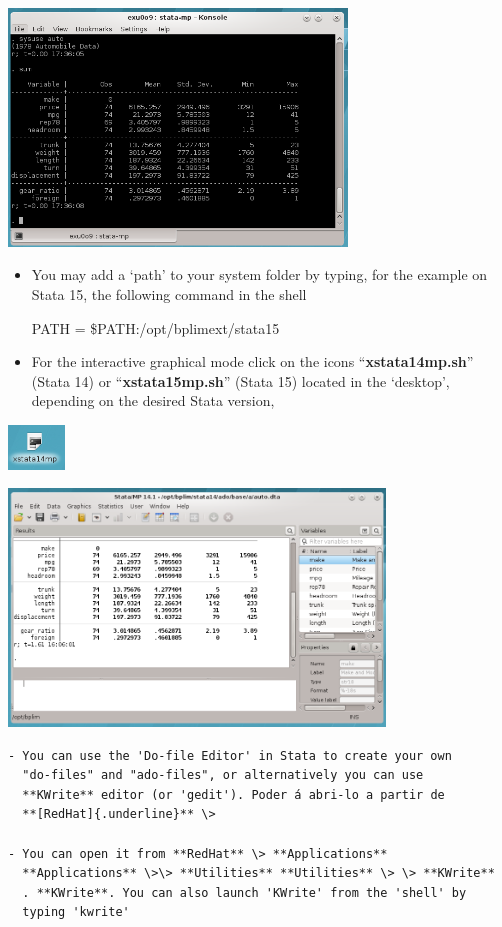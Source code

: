 \documentclass[]{book}
\begin{document}
\includegraphics[width=3.54331in,height=2.4886in]{./media/image10.png}

\begin{itemize}
\item
  You may add a `path' to your system folder by typing, for the
  example on Stata 15, the following command in the shell

  PATH = \$PATH:/opt/bplimext/stata15
\item
  For the interactive graphical mode click on the icons
  ``\textbf{{xstata14mp.sh}}'' (Stata 14) or
  ``\textbf{{xstata15mp.sh}}'' (Stata 15) located in the
  `desktop', depending on the desired Stata version,
\end{itemize}

\includegraphics[width=0.59055in,height=0.46654in]{./media/image11.png}

\includegraphics[width=3.93701in,height=2.48638in]{./media/image12.png}

\begin{verbatim}
- You can use the 'Do-file Editor' in Stata to create your own
  "do-files" and "ado-files", or alternatively you can use
  **KWrite** editor (or 'gedit'). Poder á abri-lo a partir de
  **[RedHat]{.underline}** \>

- You can open it from **RedHat** \> **Applications**
  **Applications** \>\> **Utilities** **Utilities** \> \> **KWrite**
  . **KWrite**. You can also launch 'KWrite' from the 'shell' by
  typing 'kwrite'
\end{verbatim}
\end{document}
